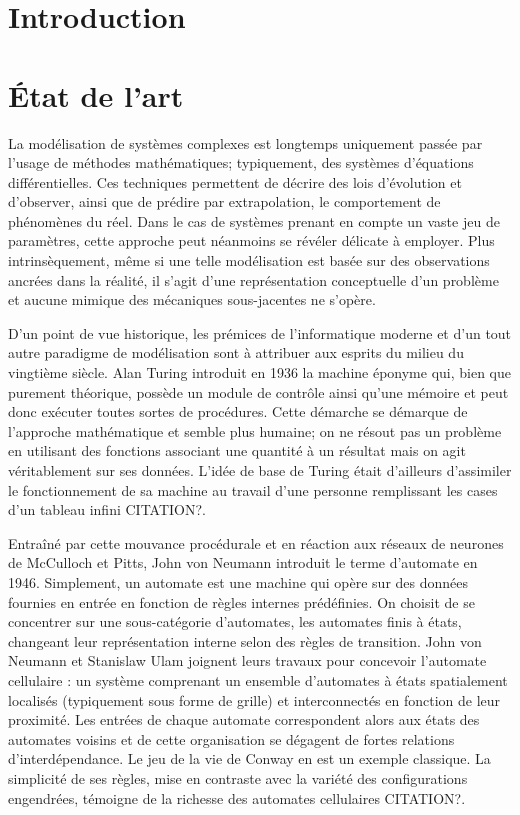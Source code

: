 \documentclass[10pt]{article}
\begin{document}
\begin{multicols}{2}

\section{Introduction}

\section{\'Etat de l'art}

La modélisation de systèmes complexes est longtemps uniquement passée
par l'usage de méthodes mathématiques; typiquement, des systèmes
d'équations différentielles. Ces techniques permettent de décrire des
lois d'évolution et d'observer, ainsi que de prédire par
extrapolation, le comportement de phénomènes du réel. Dans le cas de
systèmes prenant en compte un vaste jeu de paramètres, cette approche
peut néanmoins se révéler délicate à employer. Plus intrinsèquement,
même si une telle modélisation est basée sur des observations ancrées
dans la réalité, il s'agit d'une représentation conceptuelle d'un
problème et aucune mimique des mécaniques sous-jacentes ne s'opère.

D'un point de vue historique, les prémices de l'informatique moderne
et d'un tout autre paradigme de modélisation sont à attribuer aux
esprits du milieu du vingtième siècle. Alan Turing introduit en 1936
la machine éponyme qui, bien que purement théorique, possède un module
de contrôle ainsi qu'une mémoire et peut donc exécuter toutes sortes
de procédures. Cette démarche se démarque de l'approche mathématique
et semble plus humaine; on ne résout pas un problème en utilisant des
fonctions associant une quantité à un résultat mais on agit
véritablement sur ses données. L'idée de base de Turing était
d'ailleurs d'assimiler le fonctionnement de sa machine au travail
d'une personne remplissant les cases d'un tableau infini CITATION?.

Entraîné par cette mouvance procédurale et en réaction aux réseaux de
neurones de McCulloch et Pitts, John von Neumann introduit le terme
d'automate en 1946. Simplement, un automate est une machine qui opère
sur des données fournies en entrée en fonction de règles internes
prédéfinies. On choisit de se concentrer sur une sous-catégorie
d'automates, les automates finis à états, changeant leur
représentation interne selon des règles de transition. John von
Neumann et Stanislaw Ulam joignent leurs travaux pour concevoir
l'automate cellulaire : un système comprenant un ensemble d'automates
à états spatialement localisés (typiquement sous forme de grille) et
interconnectés en fonction de leur proximité. Les entrées de chaque
automate correspondent alors aux états des automates voisins et de
cette organisation se dégagent de fortes relations
d'interdépendance. Le jeu de la vie de Conway en est un exemple
classique. La simplicité de ses règles, mise en contraste avec la
variété des configurations engendrées, témoigne de la richesse des
automates cellulaires CITATION?.


\end{multicols}
\end{document}
